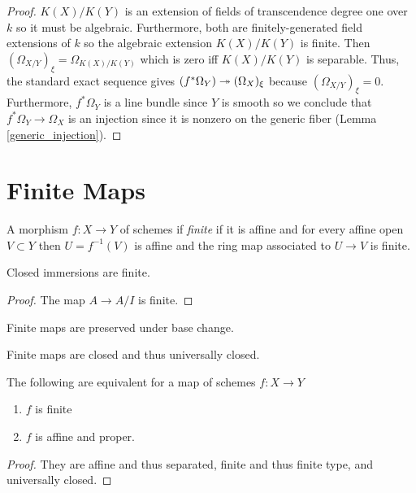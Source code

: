 \documentclass[12pt]{article}
\begin{document}
\begin{proof}
$K(X) / K(Y)$ is an extension of fields of transcendence degree one over $k$ so it must be algebraic. Furthermore, both are finitely-generated field extensions of $k$ so the algebraic extension $K(X) / K(Y)$ is finite. Then $(\Omega_{X/Y})_\xi = \Omega_{K(X)/K(Y)}$ which is zero iff $K(X) / K(Y)$ is separable. Thus, the standard exact sequence gives $(f^* \Omega_Y) \twoheadrightarrow (\Omega_X)_\xi$ because $(\Omega_{X/Y})_\xi = 0$.  Furthermore, $f^* \Omega_Y$ is a line bundle since $Y$ is smooth so we conclude that $f^* \Omega_Y \to \Omega_X$ is an injection since it is nonzero on the generic fiber (Lemma \ref{generic_injection}).
\end{proof}


\section{Finite Maps}

\begin{defn}
A morphism $f : X \to Y$ of schemes if \textit{finite} if it is affine and for every affine open $V \subset Y$ then $U = f^{-1}(V)$ is affine and the ring map associated to $U \to V$ is finite. 
\end{defn}

\begin{prop}
Closed immersions are finite.
\end{prop}

\begin{proof}
The map $A \to A / I$ is finite.
\end{proof}

\begin{prop}
Finite maps are preserved under base change.
\end{prop}

\begin{prop}
Finite maps are closed and thus universally closed.
\end{prop}


\begin{prop}
The following are equivalent for a map of schemes $f : X \to Y$
\begin{enumerate}
\item $f$ is finite
\item $f$ is affine and proper.
\end{enumerate}
\end{prop}

\begin{proof}
They are affine and thus separated, finite and thus finite type, and universally closed.
\end{proof}
\end{document}
